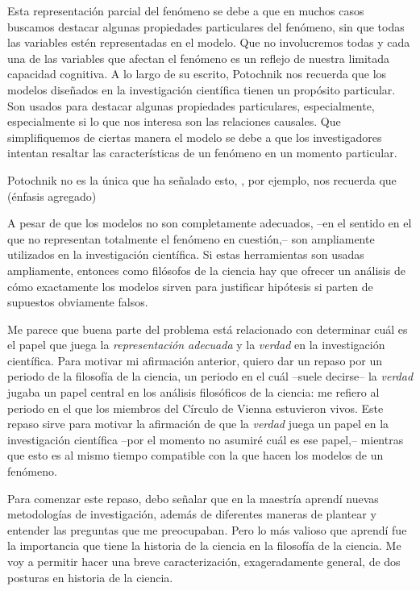 Esta representación parcial del fenómeno se debe a que en muchos casos buscamos destacar algunas propiedades particulares del fenómeno, sin que todas las variables estén representadas en el modelo.
Que no involucremos todas y cada una de las variables que afectan el fenómeno es un reflejo de nuestra limitada capacidad cognitiva.
A lo largo de su escrito, Potochnik nos recuerda que los modelos diseñados en la investigación científica tienen un propósito particular.
Son usados para destacar algunas propiedades particulares, especialmente, especialmente si lo que nos interesa son las relaciones causales.
Que simplifiquemos de ciertas manera el modelo se debe a que los investigadores intentan resaltar las características de un fenómeno en un momento particular.

Potochnik no es la única que ha señalado esto,
\textcite[][p.24]{abrams2023evolution}, por ejemplo, nos recuerda que  (énfasis agregado)

A pesar de que los modelos no son completamente adecuados, --en el sentido en el que no representan totalmente el fenómeno en cuestión,-- son ampliamente utilizados en la investigación científica.
Si estas herramientas son usadas ampliamente, entonces como filósofos de la ciencia hay que ofrecer un análisis de cómo exactamente los modelos sirven para justificar hipótesis si parten de supuestos obviamente falsos.

Me parece que buena parte del problema está relacionado con determinar cuál es el papel que juega la \emph{representación adecuada} y la \emph{verdad} en la investigación científica.
Para motivar mi afirmación anterior, quiero dar un repaso por un periodo de la filosofía de la ciencia, un periodo en el cuál --suele decirse-- la \emph{verdad} jugaba un papel central en los análisis filosóficos de la ciencia: me refiero al periodo en el que los miembros del Círculo de Vienna estuvieron vivos.
Este repaso sirve para motivar la afirmación de que la \emph{verdad} juega un papel en la investigación científica --por el momento no asumiré cuál es ese papel,-- mientras que esto es al mismo tiempo compatible con la  que hacen los modelos de un fenómeno.

Para comenzar este repaso, debo señalar que en la maestría aprendí nuevas metodologías de investigación, además de diferentes maneras de plantear y entender las preguntas que me preocupaban.
Pero lo más valioso que aprendí fue la importancia que tiene la historia de la ciencia en la filosofía de la ciencia.
Me voy a permitir hacer una breve caracterización, exageradamente general, de dos posturas en historia de la ciencia.

